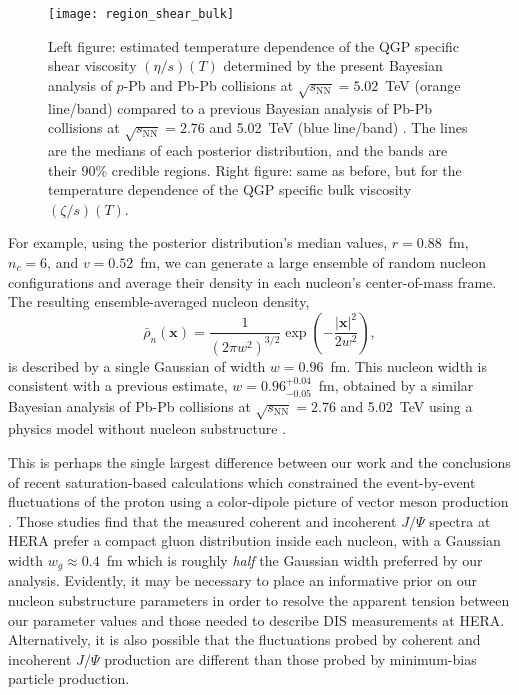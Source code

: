 \documentclass[aps,prc,reprint,amsmath,nofootinbib]{revtex4-1}
\newcommand{\sqrts}{\sqrt{s_\mathrm{NN}}}
\newcommand{\xv}{\mathbf x}
\begin{document}
\begin{figure}
  \texttt{[image: region\_shear\_bulk]}
  \caption{
    \label{fig:region_shear_bulk}
    Left figure: estimated temperature dependence of the QGP specific shear viscosity $(\eta/s)(T)$ determined by the present Bayesian analysis of $p$-Pb and Pb-Pb collisions at $\sqrts=5.02$~TeV (orange line/band) compared to a previous Bayesian analysis of Pb-Pb collisions at $\sqrts=2.76$ and 5.02~TeV (blue line/band) \cite{Bernhard:2018hnz}.
    The lines are the medians of each posterior distribution, and the bands are their 90\% credible regions.
    Right figure: same as before, but for the temperature dependence of the QGP specific bulk viscosity $(\zeta/s)(T)$.
  }
\end{figure}

For example, using the posterior distribution's median values, $r=0.88$~fm, $n_c=6$, and $v=0.52$~fm, we can generate a large ensemble of random nucleon configurations and average their density in each nucleon's center-of-mass frame.
The resulting ensemble-averaged nucleon density,
\begin{equation}
  \bar{\rho}_n(\xv) = \frac{1}{(2 \pi w^2)^{3/2}} \exp \left( -\frac{|\xv|^2}{2 w^2} \right),
\end{equation}
is described by a single Gaussian of width $w = 0.96$~fm.
This nucleon width is consistent with a previous estimate, $w = 0.96_{-0.05}^{+0.04}$~fm, obtained by a similar Bayesian analysis of Pb-Pb collisions at $\sqrts=2.76$ and 5.02~TeV using a physics model without nucleon substructure \cite{Bernhard:2018hnz}.

This is perhaps the single largest difference between our work and the conclusions of recent saturation-based calculations which constrained the event-by-event fluctuations of the proton using a color-dipole picture of vector meson production \cite{Mantysaari:2016ykx, Mantysaari:2016jaz}.
Those studies find that the measured coherent and incoherent $J/\Psi$ spectra at HERA prefer a compact gluon distribution inside each nucleon, with a Gaussian width $w_g \approx 0.4$~fm which is roughly \emph{half} the Gaussian width preferred by our analysis.
Evidently, it may be necessary to place an informative prior on our nucleon substructure parameters in order to resolve the apparent tension between our parameter values and those needed to describe DIS measurements at HERA.
Alternatively, it is also possible that the fluctuations probed by coherent and incoherent $J/\Psi$ production are different than those probed by minimum-bias particle production.
\end{document}
